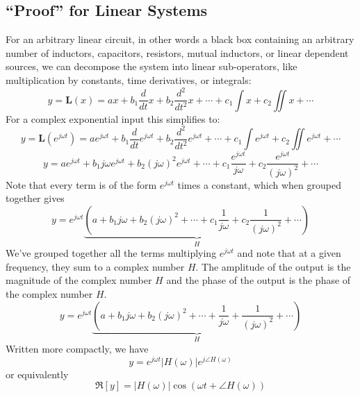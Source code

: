 \subsection{``Proof'' for Linear Systems}
For an arbitrary linear circuit, in other words a black box containing an arbitrary number of inductors, capacitors, resistors, mutual inductors, or linear dependent sources, we can  decompose the system into linear sub-operators, like multiplication by constants, time derivatives, or integrals:
    \begin{equation}
        y = \mathbf{L}(x) = a x + b_1 \frac{d}{dt} x + b_2\frac{d^2}{dt^2} x + \cdots + c_1 \int x + c_2 \iint x + \cdots
    \end{equation}
For a complex exponential input this simplifies to:
    \begin{equation}
        y  = \mathbf{L}(e^{j\omega t}) = a e^{j\omega t} + b_1 \frac{d}{dt} e^{j\omega t} + b_2\frac{d^2}{dt^2} e^{j\omega t} + \cdots + c_1 \int e^{j\omega t} + c_2 \iint e^{j\omega t} + \cdots
    \end{equation}
    \begin{equation}
        y  = a e^{j\omega t} + b_1 j\omega e^{j\omega t} + b_2 ( j\omega)^2 e^{j\omega t} + \cdots + c_1 \frac{e^{j\omega t}}{ j\omega} + c_2 \frac{e^{j\omega t}}{ (j\omega)^2} + \cdots
    \end{equation}
Note that every term is of the form $e^{j\omega t}$ times a constant, which when grouped together gives
    \begin{equation}
        y =  e^{j\omega t} \underbrace{\left(a  + b_1 j\omega  + b_2 ( j\omega)^2 + \cdots + c_1 \frac{1}{ j\omega} + c_2 \frac{1}{ (j\omega)^2}  + \cdots \right)}_{H}
    \end{equation}
We've grouped together all the terms multiplying $e^{j\omega t}$ and note that at a given frequency, they sum to a complex number $H$.    The amplitude of the output is the magnitude of the complex number $H$ and the phase of the output is the phase of the complex number $H$.
    \begin{equation}
        y =  e^{j\omega t} \underbrace{\left(a  + b_1 j\omega + b_2 ( j\omega)^2 + \cdots + \frac{1}{ j\omega} + \frac{1}{ (j\omega)^2}  + \cdots \right)}_{H}
    \end{equation}
Written more compactly, we have
    \begin{equation}
        y = e^{j\omega t} |H(\omega)| e^{j\angle H(\omega)}
    \end{equation}
or equivalently
    \begin{equation}
        \Re[ y ] =  |H(\omega)| \cos ( \omega t + \angle H(\omega))
    \end{equation}
